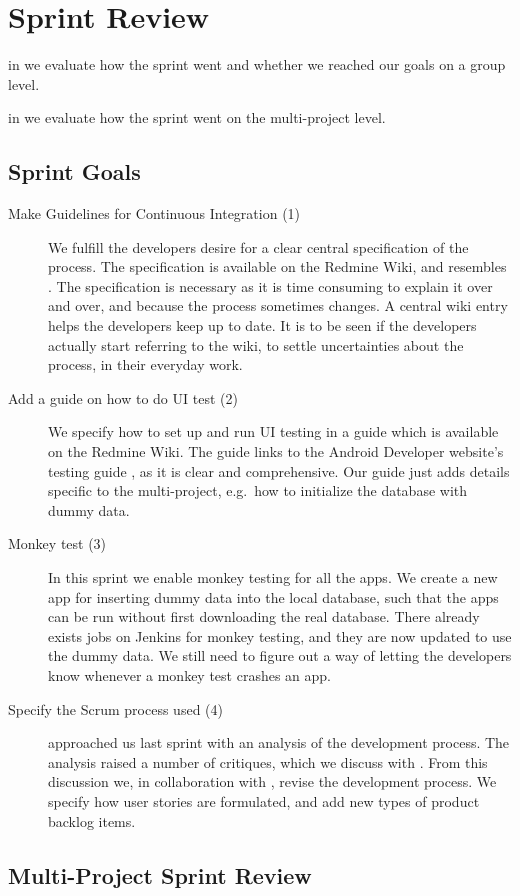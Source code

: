 \chapter{Sprint Review}\label{chap:sprint3_end}

\begin{chapterorganization}
  \item in  we evaluate how the sprint went and whether we reached our goals on a group level.
  \item in  we evaluate how the sprint went on the multi-project level.
\end{chapterorganization}

\section{Sprint Goals}\label{sec:s3_goals}
\begin{description}
    \item[Make Guidelines for Continuous Integration (1)] We fulfill the developers desire for a clear central specification of the process. The specification is available on the Redmine Wiki, and resembles . The specification is necessary as it is time consuming to explain it over and over, and because the process sometimes changes. A central wiki entry helps the developers keep up to date. It is to be seen if the developers actually start referring to the wiki, to settle uncertainties about the process, in their everyday work. 
    \item[Add a guide on how to do UI test (2)] We specify how to set up and run UI testing in a guide which is available on the Redmine Wiki. The guide links to the Android Developer website's testing guide \parencite{AndroidUnit}, as it is clear and comprehensive. Our guide just adds details specific to the multi-project, e.g.\ how to initialize the database with dummy data.  
    \item[Monkey test (3)] In this sprint we enable monkey testing for all the apps. We create a new app for inserting dummy data into the local database, such that the apps can be run without first downloading the real database. There already exists jobs on Jenkins for monkey testing, and they are now updated to use the dummy data. We still need to figure out a way of letting the developers know whenever a monkey test crashes an app.
    \item[Specify the Scrum process used (4)]  approached us last sprint with an analysis of the development process. The analysis raised a number of critiques, which we discuss with . From this discussion we, in collaboration with , revise the development process. We specify how user stories are formulated, and add new types of product backlog items.
\end{description}

\section{Multi-Project Sprint Review}\label{sec:s3_multiprj_review}
\dummy